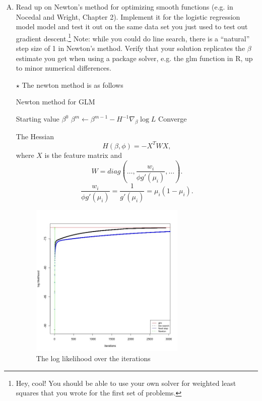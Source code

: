 \documentclass[11pt]{article}
\newcommand{\jie}{$\star$ }
\begin{document}
\begin{enumerate}[(A)]
\item  Read up on Newton's method for optimizing smooth functions (e.g. in Nocedal and Wright, Chapter 2).  Implement it for the logistic regression model model and test it out on the same data set you just used to test out gradient descent.\footnote{Hey, cool!  You should be able to use your own solver for weighted least squares that you wrote for the first set of problems.}  Note: while you could do line search, there is a ``natural'' step size of 1 in Newton's method.  Verify that your solution replicates the $\beta$ estimate you get when using a package solver, e.g. the glm function in R, up to minor numerical differences.  

\bigskip
\jie
The newton method is as follows
\begin{algorithm}[H]
\begin{algorithmic}
\caption{Newton method for GLM}
\Require Starting value $\beta^0$
    \State $ \beta^{m} \leftarrow \beta^{m-1} - H^{-1} \nabla_\beta\log L$
    \State Converge
    \EndIf
\EndWhile
\end{algorithmic}
\end{algorithm}
The Hessian
$$H(\beta,\phi) = - X^T W X,$$
where $X$ is the feature matrix and 
$$W = diag \left(\dots, \frac{w_i}{\phi g'(\mu_i)}, \dots \right).$$
$$\frac{w_i}{\phi g'(\mu_i)} = \frac{1}{g'(\mu_i)} = \mu_i(1-\mu_i).$$

\begin{figure}[h]
    \centering
    \includegraphics[width=0.7\textwidth]{figures/logl_2.jpg}
    \caption{The log likelihood over the iterations}
    \label{fig:logl_Newton}
    \end{figure}
    

\end{enumerate}
\end{document}

